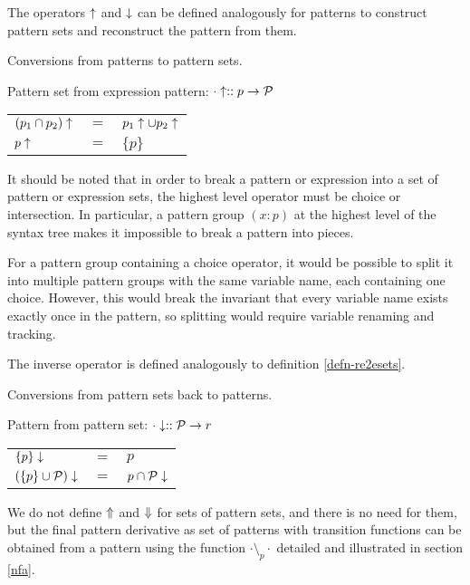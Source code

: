 The operators $\uparrow$ and $\downarrow$ can be defined analogously for
patterns to construct pattern sets and reconstruct the pattern from them.

\begin{defn}
   \label{defn-re2pset}
   Conversions from patterns to pattern sets.

   Pattern set from expression pattern:
   $\cdot\uparrow :: p \to \mathcal{P}$

   \begin{tabular}{lll}
      $(p_1 \cap p_2)\uparrow$	& $=$	& $p_1\uparrow \cup p_2\uparrow$	\\
      $p\uparrow$			& $=$	& $\{p\}$			\\
   \end{tabular}
\end{defn}

It should be noted that in order to break a pattern or expression into a set of
pattern or expression sets, the highest level operator must be choice or
intersection. In particular, a pattern group $(x:p)$ at the highest level of the
syntax tree makes it impossible to break a pattern into pieces.

For a pattern group containing a choice operator, it would be possible to split
it into multiple pattern groups with the same variable name, each containing one
choice. However, this would break the invariant that every variable name exists
exactly once in the pattern, so splitting would require variable renaming and
tracking.

The inverse operator is defined analogously to definition \ref{defn-re2esets}.

\begin{defn}
   \label{defn-re2psets}
   Conversions from pattern sets back to patterns.

   Pattern from pattern set:
   $\cdot\downarrow :: \mathcal{P} \to r$

   \begin{tabular}{lll}
      $\{p\}\downarrow$			& $=$	& $p$				\\
      $(\{p\} \cup \mathcal{P})\downarrow$	& $=$	& $p \cap \mathcal{P}\downarrow$	\\
   \end{tabular}
\end{defn}

We do not define $\Uparrow$ and $\Downarrow$ for sets of pattern sets, and
there is no need for them, but the final pattern derivative as set of patterns
with transition functions can be obtained from a pattern using the function
$\cdot \setminus_p \cdot$ detailed and illustrated in section \ref{nfa}.



